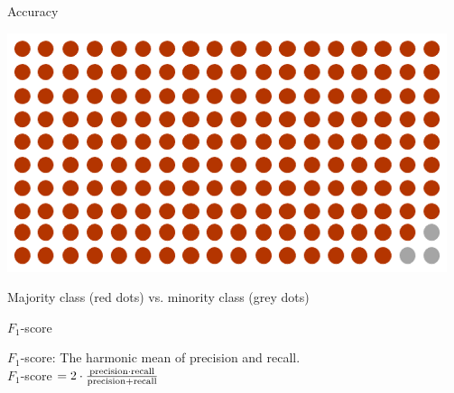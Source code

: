 \documentclass[handout]{beamer}
\begin{document}
\begin{frame}{Accuracy}
	
	\begin{center}
		\includegraphics[width=\linewidth,height=\textheight,keepaspectratio]{../pictures/imbalance.png} 
	\end{center}	
	
	Majority class (red dots) vs. minority class (grey dots) 
	
	
	
\end{frame}



\begin{frame}{\(F_1\)-score}
	
	\(F_1\)-score: The harmonic mean of precision and recall. \\
	
	\(F_1\)-score \(= 2 \cdot \frac{\rm precision \cdot recall}{\rm precision + recall}\)
	
	
	
\end{frame}
\end{document}
